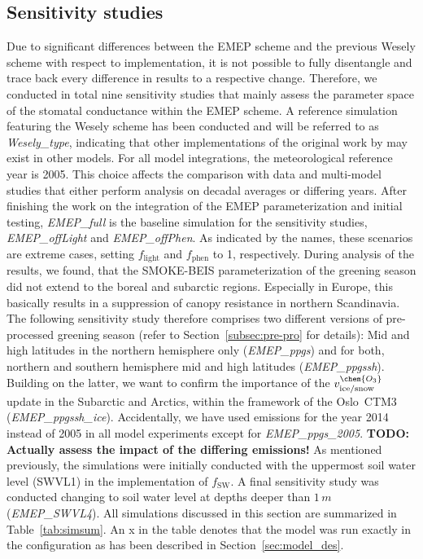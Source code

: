 \documentclass[gmd, manuscript]{copernicus}
\begin{document}
\subsection{Sensitivity studies}
\label{subsec:sens}
Due to significant differences between the EMEP scheme and the previous Wesely scheme with respect to implementation, it is not possible to fully disentangle and trace back every difference in results to a respective change. Therefore, we conducted in total nine sensitivity studies that mainly assess the parameter space of the stomatal conductance within the EMEP scheme. A reference simulation featuring the Wesely scheme has been conducted and will be referred to as \emph{Wesely\_type}, indicating that other implementations of the original work by \citet{AE:Wesely1989} may exist in other models. For all model integrations, the meteorological reference year is 2005. This choice affects the comparison with data and multi-model studies that either perform analysis on decadal averages or differing years. After finishing the work on the integration of the EMEP parameterization and initial testing, \emph{EMEP\_full} is the baseline simulation for the sensitivity studies, \emph{EMEP\_offLight} and \emph{EMEP\_offPhen}. As indicated by the names, these scenarios are extreme cases, setting $f_\text{light}$ and $f_\text{phen}$ to 1, respectively. During analysis of the results, we found, that the SMOKE-BEIS parameterization of the greening season did not extend to the boreal and subarctic regions. Especially in Europe, this basically results in a suppression of canopy resistance in northern Scandinavia. The following sensitivity study therefore comprises two different versions of pre-processed greening season (refer to Section~\ref{subsec:pre-pro} for details): Mid and high latitudes in the northern hemisphere only (\emph{EMEP\_ppgs}) and for both, northern and southern hemisphere mid and high latitudes (\emph{EMEP\_ppgssh}). Building on the latter, we want to confirm the importance of the $v^\chem{O_3}_\text{ice/snow}$ update \citep{ACP:Helmig2007} in the Subarctic and Arctics, within the framework of the Oslo~CTM3 (\emph{EMEP\_ppgssh\_ice}). Accidentally, we have used emissions for the year 2014 instead of 2005 in all model experiments except for \emph{EMEP\_ppgs\_2005}. {\bf TODO: Actually assess the impact of the differing emissions!} As mentioned previously, the simulations were initially conducted with the uppermost soil water level (SWVL1) in the implementation of $f_\text{SW}$. A final sensitivity study was conducted changing to soil water level at depths deeper than $1\,\unit{m}$ (\emph{EMEP\_SWVL4}).
All simulations discussed in this section are summarized in Table~\ref{tab:simsum}. An x in the table denotes that the model was run exactly in the configuration as has been described in Section~\ref{sec:model_des}.
\end{document}
